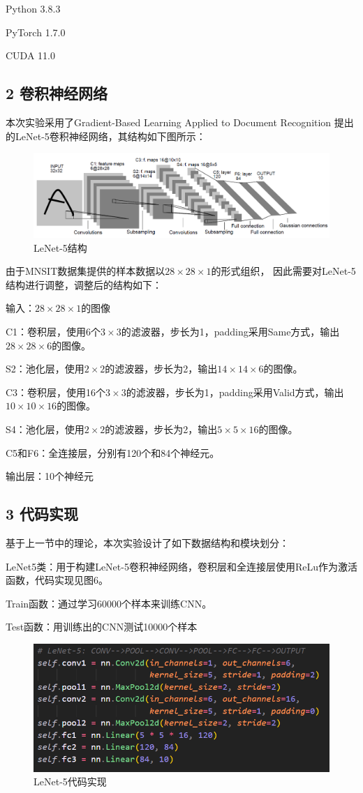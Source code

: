\documentclass[a4paper,utf8]{article}
\begin{document}
	Python 3.8.3
	
	PyTorch 1.7.0
	
	CUDA 11.0


	\subsection*{2 卷积神经网络}
	本次实验采用了Gradient-Based Learning Applied to Document Recognition
	提出的LeNet-5卷积神经网络，其结构如下图所示：
	\begin{figure}[H]
		\centering
		\includegraphics[scale=0.6]{p3-lenet5.PNG}
		\caption{LeNet-5结构}
	\end{figure}

	由于MNSIT数据集提供的样本数据以$28\times 28\times 1$的形式组织，
	因此需要对LeNet-5结构进行调整，调整后的结构如下：

	输入：$28\times 28\times 1$的图像

	C1：卷积层，使用6个$3\times 3$的滤波器，步长为1，padding采用Same方式，输出$28\times 28\times 6$的图像。

	S2：池化层，使用$2\times 2$的滤波器，步长为2，输出$14\times 14\times 6$的图像。

	C3：卷积层，使用16个$3\times 3$的滤波器，步长为1，padding采用Valid方式，输出$10\times 10\times 16$的图像。

	S4：池化层，使用$2\times 2$的滤波器，步长为2，输出$5\times 5\times 16$的图像。

	C5和F6：全连接层，分别有120个和84个神经元。

	输出层：10个神经元


	\subsection*{3 代码实现}
	基于上一节中的理论，本次实验设计了如下数据结构和模块划分：

	LeNet5类：用于构建LeNet-5卷积神经网络，卷积层和全连接层使用ReLu作为激活函数，代码实现见图6。

	Train函数：通过学习60000个样本来训练CNN。

	Test函数：用训练出的CNN测试10000个样本
	\begin{figure}[H]
		\centering
		\includegraphics[scale=0.8]{p3-lenet5-code.PNG}
		\caption{LeNet-5代码实现}
	\end{figure}
\end{document}
